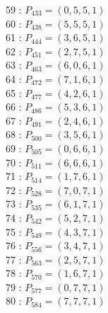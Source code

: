 \documentclass{article}
\begin{document}
{\begin{multicols}{3}
59 : $P_{433}=( 0, 5, 5, 1 )$\\
60 : $P_{438}=( 5, 5, 5, 1 )$\\
61 : $P_{444}=( 3, 6, 5, 1 )$\\
62 : $P_{451}=( 2, 7, 5, 1 )$\\
63 : $P_{463}=( 6, 0, 6, 1 )$\\
64 : $P_{472}=( 7, 1, 6, 1 )$\\
65 : $P_{477}=( 4, 2, 6, 1 )$\\
66 : $P_{486}=( 5, 3, 6, 1 )$\\
67 : $P_{491}=( 2, 4, 6, 1 )$\\
68 : $P_{500}=( 3, 5, 6, 1 )$\\
69 : $P_{505}=( 0, 6, 6, 1 )$\\
70 : $P_{511}=( 6, 6, 6, 1 )$\\
71 : $P_{514}=( 1, 7, 6, 1 )$\\
72 : $P_{528}=( 7, 0, 7, 1 )$\\
73 : $P_{535}=( 6, 1, 7, 1 )$\\
74 : $P_{542}=( 5, 2, 7, 1 )$\\
75 : $P_{549}=( 4, 3, 7, 1 )$\\
76 : $P_{556}=( 3, 4, 7, 1 )$\\
77 : $P_{563}=( 2, 5, 7, 1 )$\\
78 : $P_{570}=( 1, 6, 7, 1 )$\\
79 : $P_{577}=( 0, 7, 7, 1 )$\\
80 : $P_{584}=( 7, 7, 7, 1 )$\\
\end{multicols}


%


%


}%
\end{document}
